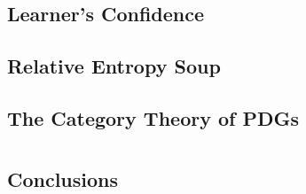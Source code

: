 \documentclass[tocprelim,
    ]{cornellmodified}
\begin{document}
\chapter{Learner's Confidence}
    

\chapter{Relative Entropy Soup}
    

\chapter{The Category Theory of PDGs}
    

\part{}  \label{part:conclusions}
\chapter{Conclusions}
    \label{chap:end}
    


% 
% 

\end{document}
